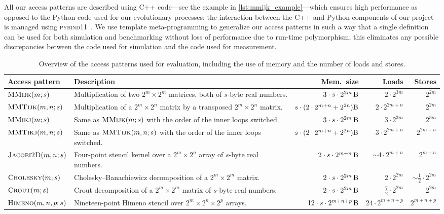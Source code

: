 All our access patterns are described using C++ code---see the example in \cref{lst:mmijk_example}---which ensures high performance as opposed to the Python code used for our evolutionary processes; the interaction between the C++ and Python components of our project is managed using \textsc{pybind11}~\cite{pybind11}. We use template meta-programming to generalize our access patterns in such a way that a single definition can be used for both simulation and benchmarking without loss of performance due to run-time polymorphism; this eliminates any possible discrepancies between the code used for simulation and the code used for measurement.

\begin{table}
    \centering
    \caption{Overview of the access patterns used for evaluation, including the use of memory and the number of loads and stores.}
    {\small
    \begin{tabular}{l p{8.7cm} r r r}
        \toprule
        Access pattern & Description & Mem.\ size & Loads & Stores  \\\midrule
        $\textsc{MMijk}(m; s)$ & Multiplication of two $2^m \times 2^m$ matrices, both of $s$-byte real numbers. & $3\cdot s \cdot 2^{2m}\,\si{\byte}$ & $2 \cdot 2^{3m}$ & $2^{2m}$ \\
        $\textsc{MMTijk}(m, n; s)$ & Multiplication of a $2^m \times 2^n$ matrix by a transposed $2^m \times 2^n$ matrix. & $s \cdot (2 \cdot 2^{m+n} + 2^{2n}) \si{\byte}$ & $2\cdot2^{2m+n}$ & $2^{2m}$ \\
        $\textsc{MMikj}(m; s)$ & Same as $\textsc{MMijk}(m;s)$ with the order of the inner loops switched. & $3\cdot s \cdot 2^{2m}\,\si{\byte}$ & $3 \cdot 2^{3m}$ & $2^{3m}$ \\
        $\textsc{MMTikj}(m, n; s)$ & Same as $\textsc{MMTijk}(m, n; s)$ with the order of the inner loops switched. & $s \cdot (2 \cdot 2^{m+n} + 2^{2n}) \si{\byte}$ & $3\cdot2^{2m+n}$ & $2^{2m+n}$ \\
        $\textsc{Jacobi2D}(m, n; s)$ & Four-point stencil kernel over a $2^m \times 2^n$ array of $s$-byte real numbers. & $2 \cdot s\cdot 2^{m+n}\,\si{\byte}$ & $\sim4 \cdot 2^{m + n}$ & $2^{m + n}$\\
        $\textsc{Cholesky}(m; s)$ & Cholesky--Banachiewicz decomposition of a $2^m \times 2^m$ matrix. & $2 \cdot s \cdot 2^{2m}\,\si{\byte}$ & $2 \cdot 2^{2m}$ & $\sim\frac{1}{2} \cdot 2^{2m}$\\
        $\textsc{Crout}(m; s)$ & Crout decomposition of a $2^m \times 2^m$ matrix of $s$-byte real numbers. & $2 \cdot s \cdot 2^{2m}\,\si{\byte}$ & $\frac{7}{2} \cdot 2^{2m}$ & $2^{2m}$ \\
        $\textsc{Himeno}(m, n, p; s)$ & Nineteen-point Himeno stencil \cite{himeno} over $2^m \times 2^n \times 2^p$ arrays. & $12\cdot s \cdot 2^{m + n + p}\,\si{\byte}$ & $24 \cdot 2^{m+n+p}$ & $2^{m+n+p}$\\
         \bottomrule
    \end{tabular}}
    \label{tab:pattern_stats}
\end{table}

